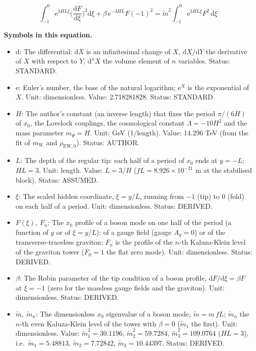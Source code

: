\documentclass[
  10pt,
]{article}
\providecommand{\tightlist}{%
  \setlength{\itemsep}{0pt}\setlength{\parskip}{0pt}}
\begin{document}
\[
\int_{-1}^{0}\mathrm{e}^{3HL\xi}\Big(\frac{\mathrm{d}F}{\mathrm{d}\xi}\Big)^2\mathrm{d}\xi + \beta\,\mathrm{e}^{-3HL}F(-1)^2
 = \tilde m^2\int_{-1}^{0}\mathrm{e}^{3HL\xi}F^2\,\mathrm{d}\xi
\]

\textbf{Symbols in this equation.}

\begin{itemize}
\tightlist
\item
  \(\mathrm{d}\): The differential: \(\mathrm{d}X\) is an infinitesimal
  change of \(X\), \(\mathrm{d}X/\mathrm{d}Y\) the derivative of \(X\)
  with respect to \(Y\), \(\mathrm{d}^nX\) the volume element of \(n\)
  variables. Status: STANDARD.
\item
  \(\mathrm{e}\): Euler's number, the base of the natural logarithm;
  \(\mathrm{e}^{X}\) is the exponential of \(X\). Unit: dimensionless.
  Value: 2.718281828. Status: STANDARD.
\item
  \(H\): The author's constant (an inverse length) that fixes the period
  \(\pi/(6H)\) of \(x_0\), the Lovelock couplings, the cosmological
  constant \(\Lambda = -10H^2\) and the mass parameter \(m_\Psi = H\).
  Unit: GeV (1/length). Value: 14.296 TeV (from the fit of
  \(m_{\mathrm{W}}\) and \(\rho_{\mathrm{EW},0}\)). Status: AUTHOR.
\item
  \(L\): The depth of the regular tip: each half of a period of \(x_0\)
  ends at \(y = -L\); \(HL = 3\). Unit: length. Value: \(L = 3/H\)
  (\(fL = 8.926\times10^{-21}\) m at the stabilised block). Status:
  ASSUMED.
\item
  \(\xi\): The scaled hidden coordinate, \(\xi = y/L\), running from
  \(-1\) (tip) to \(0\) (fold) on each half of a period. Unit:
  dimensionless. Status: DERIVED.
\item
  \(F(\xi),\ F_n\): The \(x_0\) profile of a boson mode on one half of
  the period (a function of \(y\) or of \(\xi = y/L\)): of a gauge field
  (gauge \(A_y = 0\)) or of the transverse-traceless graviton; \(F_n\)
  is the profile of the \(n\)-th Kaluza-Klein level of the graviton
  tower (\(F_0 = 1\) the flat zero mode). Unit: dimensionless. Status:
  DERIVED.
\item
  \(\beta\): The Robin parameter of the tip condition of a boson
  profile, \(\mathrm{d}F/\mathrm{d}\xi = \beta F\) at \(\xi = -1\) (zero
  for the massless gauge fields and the graviton). Unit: dimensionless.
  Status: DERIVED.
\item
  \(\tilde m,\ \tilde m_n\): The dimensionless \(x_0\) eigenvalue of a
  boson mode, \(\tilde m = m\,fL\); \(\tilde m_n\) the \(n\)-th even
  Kaluza-Klein level of the tower with \(\beta = 0\) (\(\tilde m_1\) the
  first). Unit: dimensionless. Value: \(\tilde m_1^2 = 30.1196\),
  \(\tilde m_2^2 = 59.7284\), \(\tilde m_3^2 = 109.0764\) (\(HL = 3\)),
  i.e.~\(\tilde m_1 = 5.48813\), \(\tilde m_2 = 7.72842\),
  \(\tilde m_3 = 10.44397\). Status: DERIVED.
\end{itemize}
\end{document}
